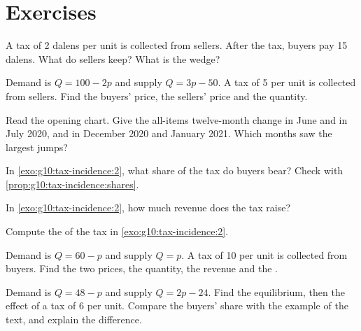 \section{Exercises}

\begin{exercise}[$\star$]\label{exo:g10:tax-incidence:1}
A tax of 2 dalens per unit is collected from sellers. After the tax, buyers pay 15 dalens. What do sellers keep? What is the wedge?
\end{exercise}

\begin{exercise}[$\star$]\label{exo:g10:tax-incidence:2}
Demand is $Q = 100 - 2p$ and supply $Q = 3p - 50$. A tax of 5 per unit is collected from sellers. Find the buyers' price, the sellers' price and the quantity.
\end{exercise}

\begin{exercise}[$\star$]\label{exo:g10:tax-incidence:3}
Read the opening chart. Give the all-items twelve-month change in June and in July 2020, and in December 2020 and January 2021. Which months saw the largest jumps?
\end{exercise}

\begin{exercise}[$\star$]\label{exo:g10:tax-incidence:4}
In \cref{exo:g10:tax-incidence:2}, what share of the tax do buyers bear? Check with \cref{prop:g10:tax-incidence:shares}.
\end{exercise}

\begin{exercise}[$\star$]\label{exo:g10:tax-incidence:5}
In \cref{exo:g10:tax-incidence:2}, how much revenue does the tax raise?
\end{exercise}

\begin{exercise}[$\star\star$]\label{exo:g10:tax-incidence:6}
Compute the  of the tax in \cref{exo:g10:tax-incidence:2}.
\end{exercise}

\begin{exercise}[$\star\star$]\label{exo:g10:tax-incidence:7}
Demand is $Q = 60 - p$ and supply $Q = p$. A tax of 10 per unit is collected from buyers. Find the two prices, the quantity, the revenue and the .
\end{exercise}

\begin{exercise}[$\star\star$]\label{exo:g10:tax-incidence:8}
Demand is $Q = 48 - p$ and supply $Q = 2p - 24$. Find the equilibrium, then the effect of a tax of 6 per unit. Compare the buyers' share with the example of the text, and explain
the difference.
\end{exercise}

